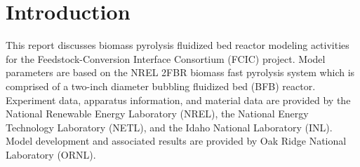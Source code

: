 
\section{Introduction}

This report discusses biomass pyrolysis fluidized bed reactor modeling activities for the Feedstock-Conversion Interface Consortium (FCIC) project. Model parameters are based on the NREL 2FBR biomass fast pyrolysis system which is comprised of a two-inch diameter bubbling fluidized bed (BFB) reactor. Experiment data, apparatus information, and material data are provided by the National Renewable Energy Laboratory (NREL), the National Energy Technology Laboratory (NETL), and the Idaho National Laboratory (INL). Model development and associated results are provided by Oak Ridge National Laboratory (ORNL).
